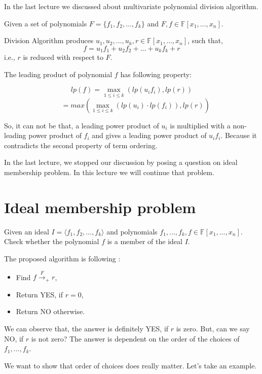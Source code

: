 
In the last lecture we discussed about multivariate polynomial division algorithm.

Given a set of polynomials $F = \{f_1,f_2,\ldots,f_k\}$ and $F, f \in \mathbb{F}[x_1, \ldots, x_n]$.

Division Algorithm produces $u_1,u_2,\ldots,u_k, r \in \mathbb{F}[x_1, \ldots, x_n]$, such that,
$$ f = u_1f_1 + u_2f_2 + \dots + u_kf_k + r $$ i.e., $r$ is reduced with respect to $F$.

The leading product of polynomial $f$ has following property:

$$lp(f) = \max_{1 \le i \le k} ( lp(u_if_i), lp(r)) $$
$$ ~~~~~= max ( \max_{1 \le i \le k} ( lp(u_i)\cdot lp(f_i)), lp(r))$$

So, it can not be that, a leading power product of $u_i$ is multiplied with a non-leading power product of $f_i$ and gives a leading power product of $u_if_i$. Because it contradicts the second property of term ordering.

In the last lecture, we stopped our discussion by posing a question on ideal membership problem. In this lecture we will continue that problem.

\section{Ideal membership problem}
\begin{problem}
Given an ideal $ I = \langle f_1,f_2,\ldots,f_k \rangle$ and  polynomials $f_1,\ldots,f_k, f \in \mathbb{F}[x_1,...,x_n]$.
Check whether the polynomial $f$ is a member of the ideal $I$.
\end{problem}

The proposed algorithm is following :
\begin{itemize}
\item Find $f {\mathop \rightarrow \limits^{F}}_{+} r$,
\item Return YES, if $ r = 0$,
\item Return NO otherwise.
\end{itemize}

We can observe that, the answer is definitely YES, if $r$ is zero. But, can we say NO, if $r$ is not zero? The answer is dependent on the order of the choices of $f_1, \ldots, f_k$.

We want to show that order of choices does really matter. Let's take an example.

